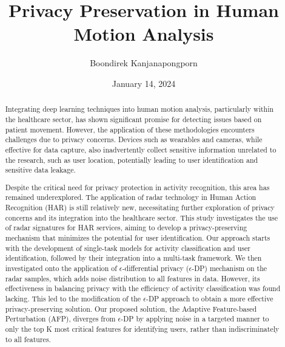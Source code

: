 \documentclass{l4proj}
\begin{document}
\title{Privacy Preservation in Human Motion Analysis}
\author{Boondirek Kanjanapongporn}
\date{January 14, 2024}

\maketitle

\begin{abstract}
    
Integrating deep learning techniques into human motion analysis, particularly within the healthcare sector, has shown significant promise for detecting issues based on patient movement. However, the application of these methodologies encounters challenges due to privacy concerns. Devices such as wearables and cameras, while effective for data capture, also inadvertently collect sensitive information unrelated to the research, such as user location, potentially leading to user identification and sensitive data leakage.
    
Despite the critical need for privacy protection in activity recognition, this area has remained underexplored. The application of radar technology in Human Action Recognition (HAR) is still relatively new, necessitating further exploration of privacy concerns and its integration into the healthcare sector. This study investigates the use of radar signatures for HAR services, aiming to develop a privacy-preserving mechanism that minimizes the potential for user identification. Our approach starts with the development of single-task models for activity classification and user identification, followed by their integration into a multi-task framework. We then investigated onto the application of $\epsilon$-differential privacy ($\epsilon$-DP) mechanism on the radar samples, which adds noise distribution to all features in data. However, its effectiveness in balancing privacy with the efficiency of activity classification was found lacking. This led to the modification of the $\epsilon$-DP approach to obtain a more effective privacy-preserving solution. Our proposed solution, the Adaptive Feature-based Perturbation (AFP), diverges from $\epsilon$-DP by applying noise in a targeted manner to only the top K most critical features for identifying users, rather than indiscriminately to all features.


\end{abstract}
\end{document}

